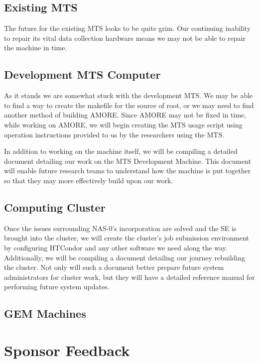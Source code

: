 \documentclass[12pt]{article}
\newcommand\tab[1][1cm]{\hspace*{#1}}
\begin{document}
\subsection{Existing MTS}

\tab The future for the existing MTS looks to be quite grim. Our continuing
inability to repair its vital data collection hardware means we may not be able
to repair the machine in time.

\subsection{Development MTS Computer}

\tab As it stands we are somewhat stuck with the development MTS. We may be able
to find a way to create the makefile for the source of root, or we may need to
find another method of building AMORE. Since AMORE may not be fixed in time,
while working on AMORE, we will begin creating the MTS usage script using
operation instructions provided to us by the researchers using the MTS.

\tab In addition to working on the machine itself, we will be compiling a
detailed document detailing our work on the MTS Development Machine. This
document will enable future research teams to understand how the machine is put
together so that they may more effectively build upon our work.

\subsection{Computing Cluster}

\tab Once the issues surrounding NAS-0's incorporation are solved and the SE is
brought into the cluster, we will create the cluster's job submission
environment by configuring HTCondor and any other software we need along the
way. Additionally, we will be compiling a document detailing our journey
rebuilding the cluster. Not only will such a document better prepare future
system administrators for cluster work, but they will have a detailed reference
manual for performing future system updates.

\subsection{GEM Machines}

\tab 

\section{Sponsor Feedback}
\end{document}
